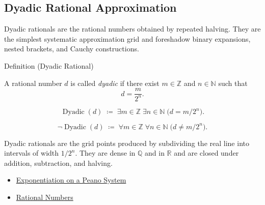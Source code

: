 
\subsection*{Dyadic Rational Approximation}
\label{sec:dyadic-rational-approximation}

\begin{exposition}
Dyadic rationals are the rational numbers obtained by repeated halving. They
are the simplest systematic approximation grid and foreshadow binary
expansions, nested brackets, and Cauchy constructions.
\end{exposition}

\begin{definitionbox}{Definition (Dyadic Rational)}
\begin{definition}
\label{def:dyadic-rational}
A rational number $d$ is called \emph{dyadic} if there exist $m\in\mathbb{Z}$
and $n\in\mathbb{N}$ such that
\[
d=\frac{m}{2^n}.
\]
\end{definition}
\end{definitionbox}

\begin{remark*}
\[
\operatorname{Dyadic}(d)
\;\coloneqq\;
\exists m\in\mathbb{Z}\;\exists n\in\mathbb{N}\;\bigl(d=m/2^n\bigr).
\]
\end{remark*}

\begin{remark*}
\[
\neg\operatorname{Dyadic}(d)
\;\coloneqq\;
\forall m\in\mathbb{Z}\;\forall n\in\mathbb{N}\;\bigl(d\neq m/2^n\bigr).
\]
\end{remark*}

\begin{remark*}[Interpretation]
Dyadic rationals are the grid points produced by subdividing the real line
into intervals of width $1/2^n$. They are dense in $\mathbb{Q}$ and in
$\mathbb{R}$ and are closed under addition, subtraction, and halving.
\end{remark*}

\begin{dependencies}
\begin{itemize}
  \item \hyperref[def:exponentiation-on-peano-system]{Exponentiation on a Peano System}
  \item \hyperref[def:rationals]{Rational Numbers}
\end{itemize}
\end{dependencies}

